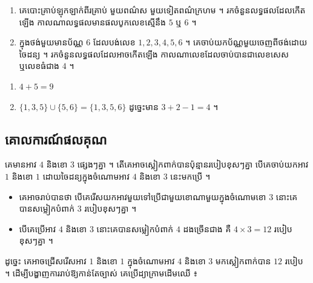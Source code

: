 \begin{pro}
\begin{enumerate}[1]
  \item គេបោះគ្រាប់ឡុកឡាក់ពីរគ្រាប់ មួយពណ៌ស មួយទៀតពណ៌ក្រហម ។ រកចំនួនលទ្ធផលដែលកើតឡើង កាលណាលទ្ធផលមានផលបូកលេខស្មើនឹង $5$ ឬ $6$ ។
  \item ក្នុងថង់មួយមានប័ណ្ណ $6$ ដែលបង់លេខ $1, 2, 3, 4, 5, 6$ ។ គេចាប់យកប័ណ្ណមួយចេញពីថង់ដោយចៃដន្យ ។ រកចំនួនលទ្ធផលដែលអាចកើតឡើង កាលណាលេខដែលចាប់បានជាលេខសេស ឬលេខធំជាង $4$ ។
\end{enumerate}
\ans
\begin{enumerate}[1]
  \item $4 + 5 = 9$
  \item $\{1, 3, 5\} \cup \{5, 6\} = \{1, 3, 5, 6\}$ ដូច្នេះមាន $3 + 2 - 1 = 4$ ។
\end{enumerate}
\end{pro}

\subsection{គោលការណ៍ផលគុណ}

\begin{example}[ឧទាហរណ៍ ១]
គេមានអាវ $4$ និងខោ $3$ ផ្សេងៗគ្នា ។ តើគេអាចស្លៀកពាក់បានប៉ុន្មានរបៀបខុសៗគ្នា បើគេចាប់យកអាវ $1$ និងខោ $1$ ដោយចៃដន្យក្នុងចំណោមអាវ $4$ និងខោ $3$ នេះមកប្រើ ។
\end{example}
\begin{itemize}
  \item គេអាចរាប់បានថា បើគេរើសយកអាវមួយទៅប្រើជាមួយខោណាមួយក្នុងចំណោមខោ $3$ នោះគេបានសម្លៀកបំពាក់ $3$ របៀបខុសៗគ្នា ។
  \item បើគេប្រើអាវ $4$ និងខោ $3$ នោះគេបានសម្លៀកបំពាក់ $4$ ដងច្រើនជាង គឺ $4\times 3 = 12$ របៀបខុសៗគ្នា ។
\end{itemize}
ដូច្នេះ គេអាចជ្រើសរើសអាវ $1$ និងខោ $1$ ក្នុងចំណោមអាវ $4$ និងខោ $3$ មកស្លៀកពាក់បាន $12$ របៀប ។ ដើម្បីបង្ហាញការរាប់ឱ្យកាន់តែច្បាស់ គេប្រើដ្យាក្រាមដើមឈើ ៖

\begin{center}
\end{center}

